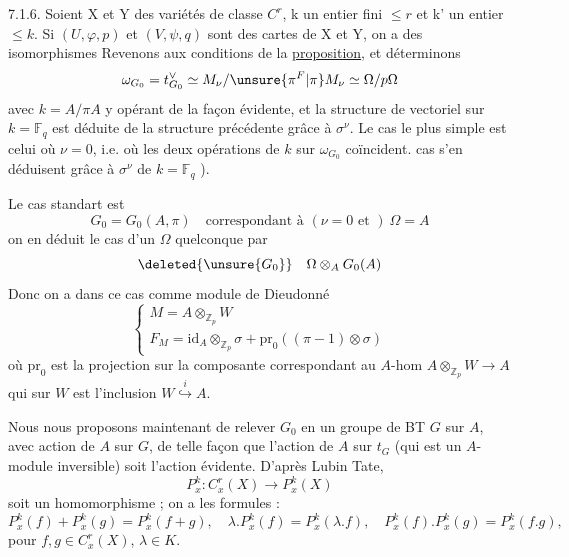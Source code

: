 7.1.6. Soient X et Y des variétés de classe $C^r$, k un entier fini $\leq r$ et k' un entier $\leq k$. Si $(U,\varphi,p)$ et $(V,\psi,q)$ sont des cartes de X et Y, on a des isomorphismes
Revenons aux conditions de la \uline{proposition}, et déterminons
\[
\omega_{G_0}=t_{G_0}^{\vee}\simeq M_\nu/\unsure{\pi^F|\pi}M_\nu\simeq\Omega/p\Omega
\]
avec $k=A/\pi A$ y opérant de la façon évidente, et la structure de vectoriel sur  $k=\mathbb F_q$ est déduite de la structure précédente grâce à $\sigma^\nu$. Le cas le plus simple est celui où $\nu=0$, i.e. où  les deux opérations de $k$ sur $\omega_{G_0}$ coïncident.   cas s'en déduisent grâce à  $\sigma^\nu$ de $k=\mathbb F_q$ \deleted{\unsure{$\sigma^\nu$}}).

Le cas standart est
\[
G_0=G_0(A,\pi)\quad\text{correspondant à }(\nu=0\text{ et })\ \Omega=A
\]
on en déduit le cas d'un $\Omega$ quelconque par
\[
\deleted{\unsure{G_0}}\quad\Omega\otimes_A G_0(A)
\]
Donc on a dans ce cas comme module de Dieudonné
\[
\begin{cases}
M=A\otimes_{\mathbb Z_p}W\\
F_M=\mathrm{id}_A\otimes_{\mathbb Z_p}\sigma+\mathrm{pr}_0((\pi-1)\otimes\sigma)
\end{cases}
\]
où $\mathrm{pr}_0$ est la projection sur la composante correspondant au $A$-hom $A\otimes_{\mathbb Z_p}W\longrightarrow A$ qui sur $W$ est l'inclusion $W\overset{i}{\hookrightarrow}A$.


Nous nous proposons maintenant de relever $G_0$  en un groupe de BT $G$ sur $A$, avec action de $A$ sur $G$, de telle façon que l'action  de $A$ sur $t_G$ (qui est un $A$-module inversible) soit l'action évidente. D'après Lubin Tate,
\[
P_x^k:C_x^r(X)\longrightarrow P_x^k(X)
\]
soit un homomorphisme ; on a les formules :
\[
P_x^k(f)+P_x^k(g)=P_x^k(f+g),\quad
\lambda.P_x^k(f)=P_x^k(\lambda.f),\quad
P_x^k(f).P_x^k(g)=P_x^k(f.g),
\]
pour $f,g\in C_x^r(X)$, $\lambda\in K$.


